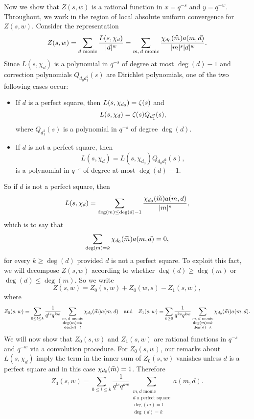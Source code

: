 \documentclass[12pt,reqno,oneside]{amsart}
\begin{document}
    Now we show that $Z(s,w)$ is a rational function in $x = q^{-s}$ and $y = q^{-w}$. Throughout, we work in the region of local absolute uniform convergence for $Z(s,w)$. Consider the representation
    \[
        Z(s,w) = \sum_{\text{$d$ monic}}\frac{L(s,\chi_{d})}{|d|^{w}} = \sum_{\text{$m,d$ monic}}\frac{\chi_{d_{0}}(\widehat{m})a(m,d)}{|m|^{s}|d|^{w}}.
    \]
    Since $L(s,\chi_{d})$ is a polynomial in $q^{-s}$ of degree at most $\deg(d)-1$ and correction polynomials $Q_{d_{0}d_{1}^{2}}(s)$ are Dirichlet polynomials, one of the two following cases occur:
    \begin{itemize}
        \item If $d$ is a perfect square, then $L(s,\chi_{d_{0}}) = \zeta(s)$ and
        \[
            L(s,\chi_{d}) = \zeta(s)Q_{d_{1}^{2}}(s),
        \]
        where $Q_{d_{1}^{2}}(s)$ is a polynomial in $q^{-s}$ of degree $\deg(d)$.
        \item If $d$ is not a perfect square, then
        \[
            L(s,\chi_{d}) = L(s,\chi_{d_{0}})Q_{d_{0}d_{1}^{2}}(s),
        \]
        is a polynomial in $q^{-s}$ of degree at most $\deg(d)-1$.
    \end{itemize}
    So if $d$ is not a perfect square, then
    \[
        L(s,\chi_{d}) = \sum_{\deg(m) \le \deg(d)-1}\frac{\chi_{d_{0}}(\widehat{m})a(m,d)}{|m|^{s}},
    \]
    which is to say that
    \[
        \sum_{\deg(m) = k}\chi_{d_{0}}(\widehat{m})a(m,d) = 0,
    \]
    for every $k \ge \deg(d)$ provided $d$ is not a perfect square. To exploit this fact, we will decompose $Z(s,w)$ according to whether $\deg(d) \ge \deg(m)$ or $\deg(d) \le \deg(m)$. So we write
    \[
        Z(s,w) = Z_{0}(s,w)+Z_{0}(w,s)-Z_{1}(s,w),
    \]
    where
    \[
        Z_{0}(s,w) = \sum_{0 \le l \le k}\frac{1}{q^{ls}q^{kw}}\sum_{\substack{\text{$m,d$ monic} \\ \deg(m) = k \\ \deg(d) = l}}\chi_{d_{0}}(\widehat{m})a(m,d) \quad \text{and} \quad Z_{1}(s,w) = \sum_{k \ge 0}\frac{1}{q^{ks}q^{kw}}\sum_{\substack{\text{$m,d$ monic} \\ \deg(m) = k \\ \deg(d) = k}}\chi_{d_{0}}(\widehat{m})a(m,d).
    \]
    We will now show that $Z_{0}(s,w)$ and $Z_{1}(s,w)$ are rational functions in $q^{-s}$ and $q^{-w}$ via a convolution procedure. For $Z_{0}(s,w)$, our remarks about $L(s,\chi_{d})$ imply the term in the inner sum of $Z_{0}(s,w)$ vanishes unless $d$ is a perfect square and in this case $\chi_{d_{0}}(\widehat{m}) = 1$. Therefore
    \[
        Z_{0}(s,w) = \sum_{0 \le l \le k}\frac{1}{q^{ls}q^{kw}}\sum_{\substack{\text{$m,d$ monic} \\ \text{$d$ a perfect square} \\ \deg(m) = l \\ \deg(d) = k}}a(m,d).
    \]
\end{document}
